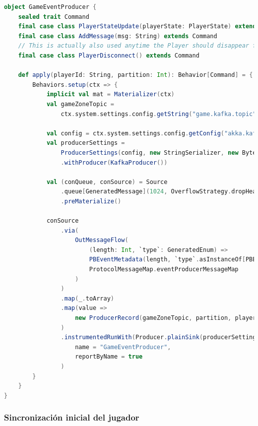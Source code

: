 \begin{lstlisting}[language=Scala, caption={\textbf{Implementación del actor GameEventProducer}}]
object GameEventProducer {
    sealed trait Command
    final case class PlayerStateUpdate(playerState: PlayerState) extends Command
    final case class AddMessage(msg: String) extends Command
    // This is actually also used anytime the Player should disappear from the map (ie. when starting a Truco match)
    final case class PlayerDisconnect() extends Command
    
    def apply(playerId: String, partition: Int): Behavior[Command] = {
        Behaviors.setup(ctx => {
            implicit val mat = Materializer(ctx)
            val gameZoneTopic =
                ctx.system.settings.config.getString("game.kafka.topic")
        
            val config = ctx.system.settings.config.getConfig("akka.kafka-producer")
            val producerSettings =
                ProducerSettings(config, new StringSerializer, new ByteArraySerializer)
                .withProducer(KafkaProducer())
        
            val (conQueue, conSource) = Source
                .queue[GeneratedMessage](1024, OverflowStrategy.dropHead)
                .preMaterialize()
        
            conSource
                .via(
                    OutMessageFlow(
                        (length: Int, `type`: GeneratedEnum) =>
                        PBEventMetadata(length, `type`.asInstanceOf[PBEventMessageType]),
                        ProtocolMessageMap.eventProducerMessageMap
                    )
                )
                .map(_.toArray)
                .map(value =>
                    new ProducerRecord(gameZoneTopic, partition, playerId, value)
                )
                .instrumentedRunWith(Producer.plainSink(producerSettings))(
                    name = "GameEventProducer",
                    reportByName = true
                )
        }
    }
}
\end{lstlisting}

\subsubsection{Sincronización inicial del jugador}

